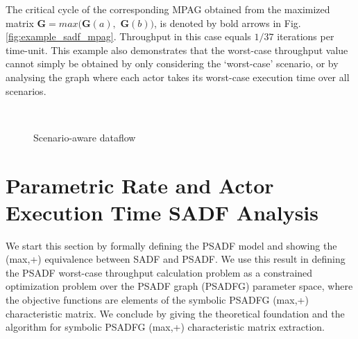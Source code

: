 \documentclass[]{eptcs}
\begin{document}
The critical cycle of the corresponding MPAG obtained from the maximized matrix $\mathbf{G}=\mathit{max}(\mathbf{G}(a),$ $ \mathbf{G}(b))$, is denoted by bold arrows in Fig. \ref{fig:example_sadf_mpag}. Throughput in this case equals $1/37$ iterations per time-unit. This example also demonstrates that the worst-case throughput value cannot simply be obtained by only considering the `worst-case' scenario, or by analysing the graph where each actor takes its worst-case execution time over all scenarios.
\begin{figure}[t]\centering
	~~~~~~~~~~~~~~~
	\caption{Scenario-aware dataflow}\label{fig:sadf}\end{figure}
\section{Parametric Rate and Actor Execution Time SADF Analysis}
We start this section by formally defining the PSADF model and showing the (max,+) equivalence between SADF and PSADF. We use this result in defining the PSADF worst-case throughput calculation problem as a constrained optimization problem over the PSADF graph (PSADFG) parameter space, where the objective functions are elements of the symbolic PSADFG (max,+) characteristic matrix. We conclude by giving the theoretical foundation and the algorithm for symbolic PSADFG (max,+) characteristic matrix extraction. 
\end{document}
